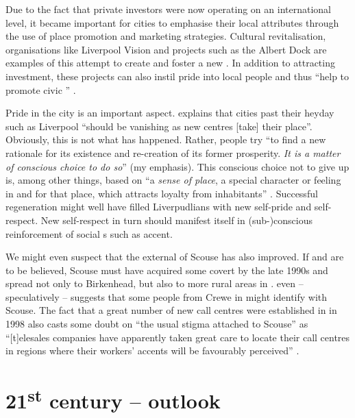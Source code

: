 Due to the fact that private investors were now operating on an international level, it became important for cities to emphasise their local attributes through the use of place promotion and marketing strategies.
Cultural revitalisation, organisations like Liverpool Vision and  projects such as the Albert Dock are examples of this attempt to create and foster a new .
In addition to attracting investment, these projects can also instil pride into local people and thus ``help to promote civic '' \citep[cf.][201--203]{percy2003}.

Pride in the city is an important aspect.
\citet[20]{fraser2003} explains that cities past their heyday such as Liverpool ``should be vanishing as new centres [take] their place''.
Obviously, this is not what has happened.
Rather, people try ``to find a new rationale for its existence and re-creation of its former prosperity. \emph{It is a matter of conscious choice to do so}'' (my emphasis).
This conscious choice not to give up is, among other things, based on ``a \emph{sense of place}, a special character or feeling in and for that place, which attracts loyalty from inhabitants'' \citep[23, emphasis in the original]{fraser2003}.
Successful regeneration might well have filled Liverpudlians with new self-pride and self-respect.
New self-respect in turn should manifest itself in (sub-)conscious reinforcement of social s such as accent.


We might even suspect that the external  of Scouse has also improved.
If \citet[73]{trudgill1999} and \citet[110]{honeybone2007} are to be believed, Scouse must have acquired some covert  by the late 1990s and spread not only to Birkenhead, but also to more rural areas in .
\citet[176--177]{montgomery2007a} even -- speculatively -- suggests that some people from Crewe in  might identify with Scouse.
The fact that a great number of new call centres were established in  in 1998 also casts some doubt on ``the usual stigma attached to Scouse'' as ``[t]elesales companies have apparently taken great care to locate their call centres in regions where their workers' accents will be favourably perceived'' \citep[3]{foulkesdocherty1999a}.

	\section{21\textsuperscript{st} century -- outlook}\label{sec.hist.21}

